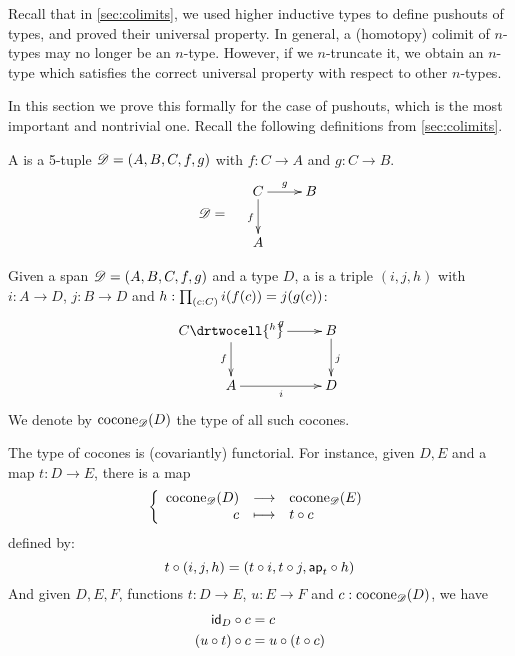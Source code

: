 Recall that in \autoref{sec:colimits}, we used higher inductive types to define pushouts of types, and proved their universal property.
In general, a (homotopy) colimit of $n$-types may no longer be an $n$-type.
However, if we $n$-truncate it, we obtain an $n$-type which satisfies the correct universal property with respect to other $n$-types.

In this section we prove this formally for the case of pushouts, which is the most important and nontrivial one.
Recall the following definitions from \autoref{sec:colimits}.

\begin{defn}
  A  %
  is a 5-tuple $\mathscr{D}=(A,B,C,f,g)$ with %
  $f:C\to{}A$ and $g:C\to{}B$.
  \[\Ddiag=\quad\vcenter{\xymatrix{C \ar^g[r] \ar_f[d] & B \\ A & }}\]
\end{defn}

\begin{defn}
  Given a span $\mathscr{D}=(A,B,C,f,g)$ and a type $D$, a %
   is a triple $(i, j, h)$ with
  $i:A\to{}D$, $j:B\to{}D$ and $h : \prd{c:C}i(f(c))=j(g(c))$:
  \[\uppercurveobject{{ }}\lowercurveobject{{ }}\twocellhead{{ }}
  \xymatrix{C \ar^g[r] \ar_f[d] \drtwocell{^h} & B \ar^j[d] \\ A \ar_i[r] & D
  }\]
  We denote by $\mathrm{cocone}_{\mathscr{D}}(D)$ the type of all such cocones.
\end{defn}

The type of cocones is (covariantly) functorial.
For instance, given $D,E$ %
and a map $t:D\to{}E$, there is a map
  \[\left\{\begin{array}{rcl}\mathrm{cocone}_{\mathscr{D}}(D) & \longrightarrow & \mathrm{cocone}_{\mathscr{D}}(E) \\ c & \longmapsto & t\circ c \end{array}\right.\]
  defined by:
  \[t\circ(i,j,h)=(t\circ{}i,t\circ{}j,\mathsf{ap}_{t}\circ{}h)\]
And given $D,E,F$, %
functions $t:D\to{}E$, $u:E\to{}F$ and $c:\mathrm{cocone}_{\mathscr{D}}(D)$, we have
\begin{align}
  \composecocone{\idfunc[D]}c &= c \label{eq:composeconeid}\\
  \composecocone{(u\circ{}t)}c&=\composecocone{u}(\composecocone{t}c)\label{eq:composeconefunc}
\end{align}

